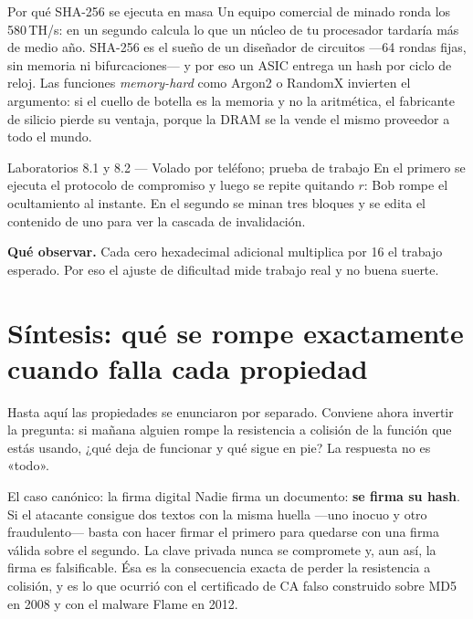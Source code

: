 \documentclass[11pt,a4paper]{article}
\theoremstyle{definition}
\theoremstyle{plain}
\theoremstyle{remark}
\begin{document}
\begin{nota}{Por qué SHA-256 se ejecuta en masa}
Un equipo comercial de minado ronda los 580\,TH/s: en un segundo calcula lo que
un núcleo de tu procesador tardaría más de medio año. SHA-256 es el sueño de un
diseñador de circuitos ---64 rondas fijas, sin memoria ni bifurcaciones--- y por
eso un ASIC entrega un hash por ciclo de reloj. Las funciones \emph{memory-hard}
como Argon2 o RandomX invierten el argumento: si el cuello de botella es la
memoria y no la aritmética, el fabricante de silicio pierde su ventaja, porque la
DRAM se la vende el mismo proveedor a todo el mundo.
\end{nota}

\begin{laboratorio}{Laboratorios 8.1 y 8.2 — Volado por teléfono; prueba de trabajo}
En el primero se ejecuta el protocolo de compromiso y luego se repite quitando
$r$: Bob rompe el ocultamiento al instante. En el segundo se minan tres bloques y
se edita el contenido de uno para ver la cascada de invalidación.

\textbf{Qué observar.} Cada cero hexadecimal adicional multiplica por 16 el
trabajo esperado. Por eso el ajuste de dificultad mide trabajo real y no buena
suerte.
\end{laboratorio}

\section{Síntesis: qué se rompe exactamente cuando falla cada propiedad}

Hasta aquí las propiedades se enunciaron por separado. Conviene ahora invertir la
pregunta: si mañana alguien rompe la resistencia a colisión de la función que
estás usando, ¿qué deja de funcionar y qué sigue en pie? La respuesta no es
«todo».

\begin{caso}{El caso canónico: la firma digital}
Nadie firma un documento: \textbf{se firma su hash}. Si el atacante consigue dos
textos con la misma huella ---uno inocuo y otro fraudulento--- basta con hacer
firmar el primero para quedarse con una firma válida sobre el segundo. La clave
privada nunca se compromete y, aun así, la firma es falsificable. Ésa es la
consecuencia exacta de perder la resistencia a colisión, y es lo que ocurrió con
el certificado de CA falso construido sobre MD5 en 2008 y con el malware Flame en
2012.
\end{caso}
\end{document}
